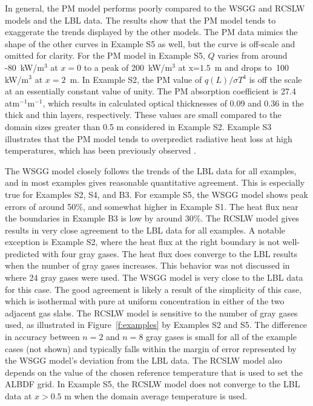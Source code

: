 \documentclass[preprint,12pt]{elsarticle}
\begin{document}
    In general, the PM model performs poorly compared to the WSGG and RCSLW models and the LBL data. The results show
    that the PM model tends to exaggerate the trends displayed by the other models. The PM data mimics the shape of
    the other curves in Example S5 as well, but the curve is off-scale and omitted for clarity. For the PM model in
    Example S5, $Q$ varies from around -80~kW/m$^3$ at $x=0$ to a peak of 200~kW/m$^3$ at x=$1.5$~m and drops to~100
    kW/m$^3$ at $x=2$~m.
    In Example S2, the PM value of $q(L)/\sigma T^4$ is off the scale at an essentially constant value of unity. The
    PM absorption coefficient is 27.4 atm$^{-1}$m$^{-1}$, which results in calculated optical thicknesses of 0.09
    and 0.36 in the thick and thin layers, respectively. These values are small compared to the domain sizes greater
    than 0.5 m considered in Example S2.
    Example S3 illustrates that the PM model tends to overpredict radiative heat loss at high temperatures, which
    has been previously observed \cite{Frank_2000,Zhu_2002,Coelho_2002}.

    The WSGG model closely follows the trends of the LBL data for all examples, and in most examples gives reasonable
    quantitative agreement. This is especially true for Examples S2, S4, and B3. For example S5, the WSGG model shows
    peak errors of around 50\%, and somewhat higher in Example S1. The heat flux near the boundaries in Example B3 is
    low by around 30\%. The RCSLW model gives results in very close agreement to the LBL data for all examples. A
    notable exception is Example S2, where the heat flux at the right boundary is not well-predicted with four gray
    gases. The heat flux does converge to the LBL results when the number of gray gases increases. This behavior was
    not discussed in \cite{Solovjov_2017} where 24 gray gases were used. The WSGG model is very close to the LBL data
    for this case. The good agreement is likely a result of the simplicity of this case, which is isothermal with pure
     at uniform concentration in either of the two adjacent gas slabs.
    The RCSLW model is sensitive to the number of gray gases used, as illustrated in Figure~\ref{f:examples} by
    Examples S2 and S5. The difference in accuracy between $n=2$ and $n=8$ gray gases is small for all of the example
    cases (not shown) and typically falls within the margin of error represented by the WSGG model's deviation from
    the LBL data.
    The RCSLW model also depends on the value of the chosen reference temperature that is used to set the ALBDF grid.
    In Example S5, the RCSLW model does not converge to the LBL data at $x>0.5$ m when the domain average temperature
    is used.
\end{document}
